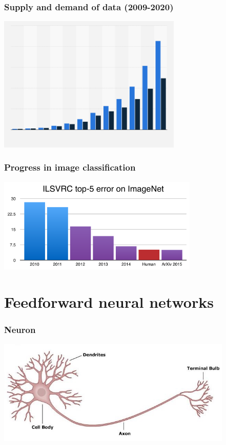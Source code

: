 \documentclass[10pt]{beamer}
\begin{document}
\begin{frame}
\frametitle{Supply and demand of data (2009-2020)}
\centerline{\includegraphics[height=6.5cm]{images/data.png}}
\end{frame}

\begin{frame}
\frametitle{Progress in image classification}
\centerline{\includegraphics[height=4.5cm]{images/images_alt.png}}
\end{frame}

\section{Feedforward neural networks}

\begin{frame}
  \frametitle{Neuron}
  \begin{center}
  \includegraphics[height=5cm]{images/neuron.jpg}
  \end{center}
\end{frame}
\end{document}

